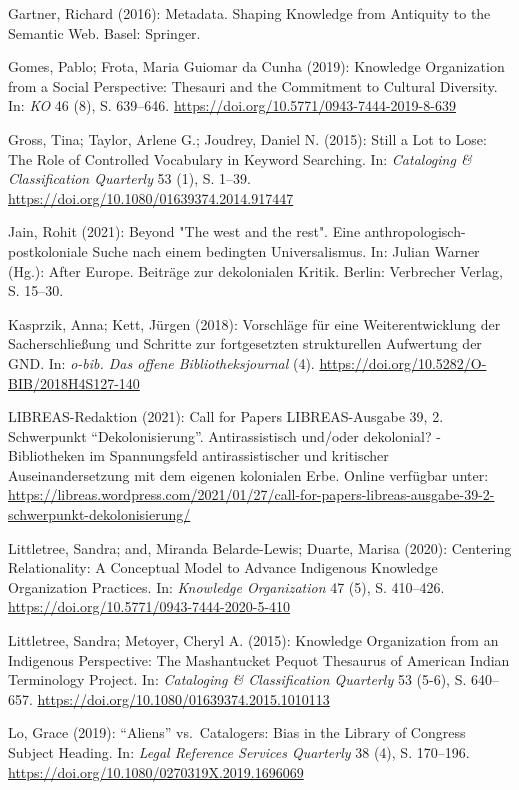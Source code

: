 \documentclass[a4paper,
fontsize=11pt,
oneside,
numbers=noperiodatend,
parskip=half-,
bibliography=totoc,
final
]{scrartcl}
\begin{document}
Gartner, Richard (2016): Metadata. Shaping Knowledge from Antiquity to
the Semantic Web. Basel: Springer.

Gomes, Pablo; Frota, Maria Guiomar da Cunha (2019): Knowledge
Organization from a Social Perspective: Thesauri and the Commitment to
Cultural Diversity. In: \emph{KO} 46 (8), S. 639--646.
\url{https://doi.org/10.5771/0943-7444-2019-8-639}

Gross, Tina; Taylor, Arlene G.; Joudrey, Daniel N. (2015): Still a Lot
to Lose: The Role of Controlled Vocabulary in Keyword Searching. In:
\emph{Cataloging \& Classification Quarterly} 53 (1), S. 1--39.
\url{https://doi.org/10.1080/01639374.2014.917447}

Jain, Rohit (2021): Beyond "The west and the rest". Eine
anthropologisch-postkoloniale Suche nach einem bedingten Universalismus.
In: Julian Warner (Hg.): After Europe. Beiträge zur dekolonialen Kritik.
Berlin: Verbrecher Verlag, S. 15--30.

Kasprzik, Anna; Kett, Jürgen (2018): Vorschläge für eine
Weiterentwicklung der Sacherschließung und Schritte zur fortgesetzten
strukturellen Aufwertung der GND. In: \emph{o-bib. Das offene
Bibliotheksjournal} (4).
\url{https://doi.org/10.5282/O-BIB/2018H4S127-140}

LIBREAS-Redaktion (2021): Call for Papers LIBREAS-Ausgabe 39, 2.
Schwerpunkt \enquote{Dekolonisierung}. Antirassistisch und/oder
dekolonial? - Bibliotheken im Spannungsfeld antirassistischer und
kritischer Auseinandersetzung mit dem eigenen kolonialen Erbe. Online
verfügbar unter:
\href{https://libreas.wordpress.com/2021/01/27/call-for-papers-libreas-ausgabe-39-2-schwerpunkt-dekolonisierung/}{https://libreas.wordpress.com/2021/01/27/call-for-papers-libreas-ausgabe-39-2-\linebreak schwerpunkt-dekolonisierung/}

Littletree, Sandra; and, Miranda Belarde-Lewis; Duarte, Marisa (2020):
Centering Relationality: A Conceptual Model to Advance Indigenous
Knowledge Organization Practices. In: \emph{Knowledge Organization} 47
(5), S. 410--426. \url{https://doi.org/10.5771/0943-7444-2020-5-410}

Littletree, Sandra; Metoyer, Cheryl A. (2015): Knowledge Organization
from an Indigenous Perspective: The Mashantucket Pequot Thesaurus of
American Indian Terminology Project. In: \emph{Cataloging \&
Classification Quarterly} 53 (5-6), S. 640--657.
\url{https://doi.org/10.1080/01639374.2015.1010113}

Lo, Grace (2019): \enquote{Aliens} vs.~Catalogers: Bias in the Library
of Congress Subject Heading. In: \emph{Legal Reference Services
Quarterly} 38 (4), S. 170--196.
\url{https://doi.org/10.1080/0270319X.2019.1696069}
\end{document}
